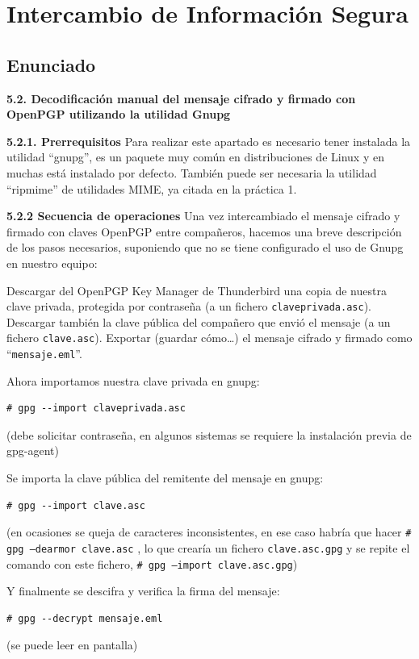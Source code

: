 \chapter{Intercambio de Información Segura}

\section{Enunciado}

\textbf{5.2. Decodificación manual del mensaje cifrado y firmado con OpenPGP utilizando la utilidad Gnupg}

\textbf{5.2.1. Prerrequisitos}
Para realizar este apartado es necesario tener instalada la utilidad ``gnupg'', es un paquete muy común
en distribuciones de Linux y en muchas está instalado por defecto.
También puede ser necesaria la utilidad ``ripmime'' de utilidades MIME, ya citada en la práctica 1.

\textbf{5.2.2 Secuencia de operaciones}
Una vez intercambiado el mensaje cifrado y firmado con claves OpenPGP entre compañeros,
hacemos una breve descripción de los pasos necesarios, suponiendo que no se tiene configurado el
uso de Gnupg en nuestro equipo:

Descargar del OpenPGP Key Manager de Thunderbird una copia de nuestra clave privada, protegida
por contraseña (a un fichero \texttt{claveprivada.asc}).
Descargar también la clave pública del compañero que envió el mensaje (a un fichero \texttt{clave.asc}).
Exportar (guardar cómo\dots) el mensaje cifrado y firmado como ``\texttt{mensaje.eml}''.

Ahora importamos nuestra clave privada en gnupg:
\begin{lstlisting}
# gpg --import claveprivada.asc
\end{lstlisting}
(debe solicitar contraseña, en algunos sistemas se requiere la instalación previa de gpg-agent)

Se importa la clave pública del remitente del mensaje en gnupg:
\begin{lstlisting}
# gpg --import clave.asc
\end{lstlisting}
(en ocasiones se queja de caracteres inconsistentes, en ese caso habría que hacer \texttt{\# gpg --dearmor clave.asc} , lo que crearía un fichero \texttt{clave.asc.gpg} y se repite el comando con este fichero, \texttt{\# gpg --import clave.asc.gpg})

Y finalmente se descifra y verifica la firma del mensaje:
\begin{lstlisting}
# gpg --decrypt mensaje.eml
\end{lstlisting}
(se puede leer en pantalla)

